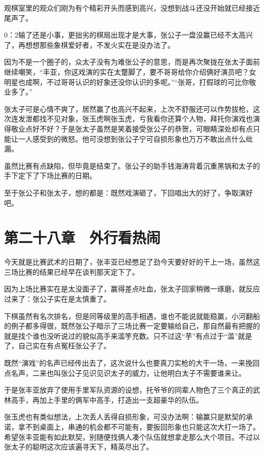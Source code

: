 观棋室里的观众们刚为有个精彩开头而感到高兴，没想到战斗还没开始就已经接近尾声了。

0：2输了还是小事，更拙劣的棋局出现才是大事，张公子一盘没赢已经不太高兴了，再想想那些象棋爱好者，不发火实在是没办法了。

因为不是一个圈子的，众太子没有为难张公子的意思，而是再次聚拢在张太子面前继续嘲笑，“丰亚，你这戏演的实在太蹩脚了，要不哥哥给你介绍俩好演员吧？女明星也成啊，不过哥哥认识的好象还没你认识的多呢。”“张哥，打假球的可比你敬业多了。”

张太子可是心情不爽了，居然赢了也高兴不起来，上次不舒服还可以作势拔枪，这次连发泄都找不见对象，张玉虎啊张玉虎，亏我看你还算个人物，拜托你演戏也演得敬业点好不好？于是张太子虽然是笑着接受张公子的恭贺，可眼睛深处却有点只能让一人感受到的微怒。他可没想到张公子宁可自损形象也万万不敢出点什么纰漏。

虽然比赛有点缺陷，但毕竟是结束了。张公子的助手钱海涛背着沉重黑锅和太子的手下定下了下场比赛的日期。

至于张公子和张太子，想的都是：既然戏演砸了，下回唱出大的好了，争取演好吧。

\section{第二十八章　外行看热闹}

今天就是比赛武术的日期了，张丰亚已经憋足了劲今天要好好的干上一场，虽然这三场比赛的结果已经早在谈判那天定下了。

因为上场比赛实在是太没面子了，赢得差点吐血，张太子回家稍微一琢磨，就反应过来了：张公子实在是太慎重了。

下棋虽然有名次排名，但是同等级里的高手相遇，谁也不能说就能稳赢，小河翻船的例子都多得很，既然张公子暗示了三场比赛一定要输给自己，那自然最有把握的就是找个谁也没听说过的貌似高手来滥竽充数。只不过这“芋”有点过于“滥”就是了，自己实在有点冤枉张公子了。

既然“演戏”的名声已经传出去了，这次说什么也要真刀实枪的大干一场，一来挽回点名声，二来也叫张公子见识见识太子的威力，让他明白太子不需要谁来让。

于是张丰亚放弃了使用手里军队资源的设想，托爷爷的同辈人物色了三个真正的武林高手，再加上手里的俩军中高手，打造出一支超豪华的队伍。

张玉虎也有类似想法，上次丢人丢得自损形象，可没办法啊：输赢只是默契的承诺，拿不到桌面上，串通的机会都不可能有，要扳回形象也只能这次大打一场了。希望张丰亚能有如此默契，别随便找俩人凑个队伍就想拿走那么大个项目。不过以张太子的聪明这次应该遍寻天下，精英尽出了。

